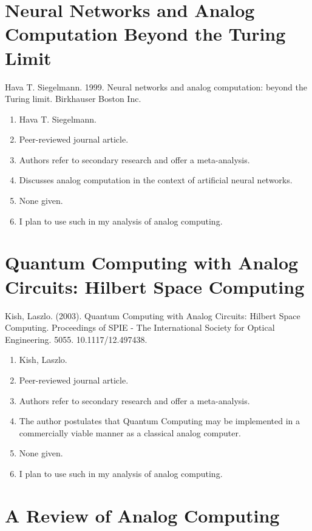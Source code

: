 \section*{Neural Networks and Analog Computation Beyond the Turing Limit}

Hava T. Siegelmann. 1999. Neural networks and analog computation: beyond the Turing limit. Birkhauser Boston Inc.

\begin{enumerate}
    \item Hava T. Siegelmann.
    \item Peer-reviewed journal article.
    \item Authors refer to secondary research and offer a meta-analysis.
    \item Discusses analog computation in the context of artificial neural networks.
    \item None given. 
    \item I plan to use such in my analysis of analog computing. 
\end{enumerate}

\section*{Quantum Computing with Analog Circuits: Hilbert Space Computing}

Kish, Laszlo. (2003). Quantum Computing with Analog Circuits: Hilbert Space Computing. Proceedings of SPIE - The International Society for Optical Engineering. 5055. 10.1117/12.497438. 

\begin{enumerate}
    \item Kish, Laszlo.
    \item Peer-reviewed journal article.
    \item Authors refer to secondary research and offer a meta-analysis.
    \item The author postulates that Quantum Computing may be implemented in a commercially viable manner as a classical analog computer. 
    \item None given. 
    \item I plan to use such in my analysis of analog computing. 
\end{enumerate}

\section*{A Review of Analog Computing}

